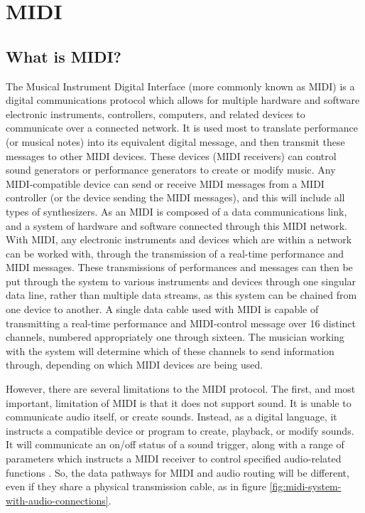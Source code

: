 \section[MIDI: An Introduction]{MIDI}\label{section:midi}

\subsection[What is MIDI?]{What is MIDI?}\label{section:what-midi}
The Musical Instrument Digital Interface (more commonly known as MIDI) is a digital communications protocol which allows for multiple hardware and software electronic instruments, controllers, computers, and related devices to communicate over a connected network\cite{Huber_2012}. It is used most to translate performance  (or musical notes) into its equivalent digital message, and then transmit these messages to other MIDI devices. These devices (MIDI receivers) can control sound generators or performance generators to create or modify music. Any MIDI-compatible device can send or receive MIDI messages from a MIDI controller (or the device sending the MIDI messages), and this will include all types of synthesizers. As an  MIDI is composed of a data communications link, and a system of hardware and software connected through this MIDI network. With MIDI, any electronic instruments and devices which are within a network can be worked with, through the transmission of a real-time performance and MIDI messages. These transmissions of performances and messages can then be put through the system to various instruments and devices through one singular data line, rather than multiple data streams, as this system can be chained from one device to another. A single data cable used with MIDI is capable of transmitting a real-time performance and MIDI-control message over 16 distinct channels, numbered appropriately one through sixteen. The musician working with the system will determine which of these channels to send information through, depending on which MIDI devices are being used\cite{Romano_2003}.

However, there are several limitations to the MIDI protocol. The first, and most important, limitation of MIDI is that it does not support sound. It is unable to communicate audio itself, or create sounds\cite{Huber_2012}. Instead, as a digital language, it instructs a compatible device or program to create, playback, or modify sounds. It will communicate an on/off status of a sound trigger, along with a range of parameters which instructs a MIDI receiver to control specified audio-related functions \cite{Kirk_Hunt_2013}. So, the data pathways for MIDI and audio routing will be different, even if they share a physical transmission cable, as in figure \ref{fig:midi-system-with-audio-connections}\cite{Huber_2012}. 

